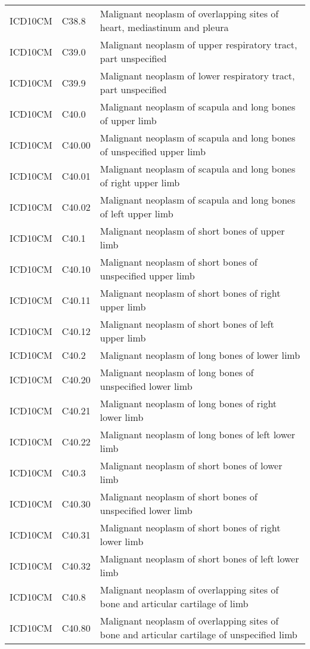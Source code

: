 \begin{longtable}{p{}p{}p{}}
  ICD10CM & C38.8 & Malignant neoplasm of overlapping sites of heart, mediastinum and pleura \\ 
  ICD10CM & C39.0 & Malignant neoplasm of upper respiratory tract, part unspecified \\ 
  ICD10CM & C39.9 & Malignant neoplasm of lower respiratory tract, part unspecified \\ 
  ICD10CM & C40.0 & Malignant neoplasm of scapula and long bones of upper limb \\ 
  ICD10CM & C40.00 & Malignant neoplasm of scapula and long bones of unspecified upper limb \\ 
  ICD10CM & C40.01 & Malignant neoplasm of scapula and long bones of right upper limb \\ 
  ICD10CM & C40.02 & Malignant neoplasm of scapula and long bones of left upper limb \\ 
  ICD10CM & C40.1 & Malignant neoplasm of short bones of upper limb \\ 
  ICD10CM & C40.10 & Malignant neoplasm of short bones of unspecified upper limb \\ 
  ICD10CM & C40.11 & Malignant neoplasm of short bones of right upper limb \\ 
  ICD10CM & C40.12 & Malignant neoplasm of short bones of left upper limb \\ 
  ICD10CM & C40.2 & Malignant neoplasm of long bones of lower limb \\ 
  ICD10CM & C40.20 & Malignant neoplasm of long bones of unspecified lower limb \\ 
  ICD10CM & C40.21 & Malignant neoplasm of long bones of right lower limb \\ 
  ICD10CM & C40.22 & Malignant neoplasm of long bones of left lower limb \\ 
  ICD10CM & C40.3 & Malignant neoplasm of short bones of lower limb \\ 
  ICD10CM & C40.30 & Malignant neoplasm of short bones of unspecified lower limb \\ 
  ICD10CM & C40.31 & Malignant neoplasm of short bones of right lower limb \\ 
  ICD10CM & C40.32 & Malignant neoplasm of short bones of left lower limb \\ 
  ICD10CM & C40.8 & Malignant neoplasm of overlapping sites of bone and articular cartilage of limb \\ 
  ICD10CM & C40.80 & Malignant neoplasm of overlapping sites of bone and articular cartilage of unspecified limb \\ 

\end{longtable}
